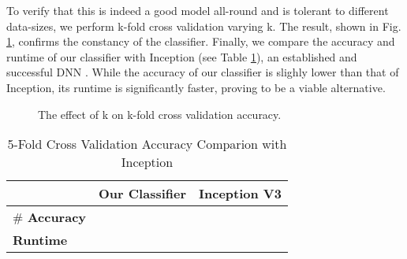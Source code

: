 To verify that this is indeed a good model all-round and is tolerant to different data-sizes, we perform k-fold cross validation varying k. The result, shown in Fig. \ref{fig:k_fold}, confirms the constancy of the classifier. Finally, we compare the accuracy and runtime of our classifier with Inception (see Table \ref{tab:inception_comp}), an established and successful DNN \cite{b6_1}. While the accuracy of our classifier is slighly lower than that of Inception, its runtime is significantly faster, proving to be a viable alternative.

\begin{figure}[tp]
	\caption{The effect of k on k-fold cross validation accuracy.}
	\label{fig:k_fold}
\end{figure}

\bgroup
\def\arraystretch{1.5}
\begin{table}[htbp]
	\caption{5-Fold Cross Validation Accuracy Comparion with Inception}
	\begin{center}
		\begin{tabular}{|l|>{\centering\arraybackslash}m{1.75cm}|>{\centering\arraybackslash}m{1.75cm}|}
			\hline
			& \textbf{Our Classifier} & \textbf{Inception V3} \\
			\hline
			\# \textbf{Accuracy} &  &  \\
			\hline
			\textbf{Runtime} &  &  \\
			\hline
		\end{tabular}
		\label{tab:inception_comp}
	\end{center}
\end{table}
\egroup